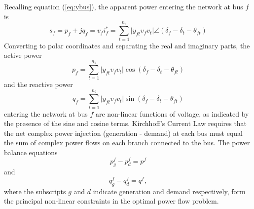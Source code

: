 Recalling equation (\ref{eq:ybus}), the apparent power entering the network at
bus $f$ is
\begin{equation}
s_f = p_f+jq_f = v_f i_f^* = \sum_{t=1}^{n_b} \vert y_{ft}v_f v_t \vert \angle
(\delta_f - \delta_t - \theta_{ft})
\end{equation}
Converting to polar coordinates and separating the real and imaginary parts,
the active power
\begin{equation}
p_f = \sum_{t=1}^{n_b} \vert y_{ft}v_f v_t \vert \cos(\delta_f - \delta_t -
\theta_{ft})
\end{equation}
and the reactive power
\begin{equation}
q_f = \sum_{t=1}^{n_b} \vert y_{ft}v_f v_t \vert \sin(\delta_f - \delta_t -
\theta_{ft})
\end{equation}
entering the network at bus $f$ are non-linear functions of voltage, as
indicated by the presence of the sine and cosine terms.
Kirchhoff's Current Law requires that the net complex power injection
(generation - demand) at each bus must equal the sum of complex power flows on
each branch connected to the bus.  The power balance equations
\begin{equation}
\label{eq:p_balance}
p_g^f - p_d^f = p^f
\end{equation}
and
\begin{equation}
\label{eq:q_balance}
q_g^f - q_d^f = q^f,
\end{equation}
where the subscripts $g$ and $d$ indicate generation and demand
respectively, form the principal non-linear constraints in the optimal power
flow problem.

